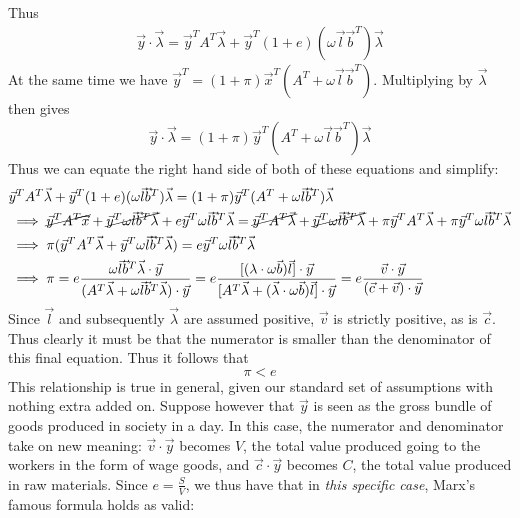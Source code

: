 Thus 
\begin{align*}
	\vec{y} \cdot \vec{\lambda} = \vec{y}^TA^T\vec{\lambda} + \vec{y}^T(1+e)(\omega\vec{l}\vec{b}^T)\vec{\lambda}
\end{align*}
At the same time we have $\vec{y}^T = (1+\pi)\vec{x}^T(A^T + \omega\vec{l}\vec{b}^T)$. Multiplying by $\vec{\lambda}$ then gives
\begin{align*}
	\vec{y}\cdot \vec{\lambda} = (1+\pi)\vec{y}^T(A^T + \omega\vec{l}\vec{b}^T)\vec{\lambda}
\end{align*}
Thus we can equate the right hand side of both of these equations and simplify:
\begin{align*}
	& \vec{y}^TA^T\vec{\lambda} + \vec{y}^T(1+e)(\omega\vec{l}\vec{b}^T)\vec{\lambda} = (1+\pi)\vec{y}^T(A^T + \omega\vec{l}\vec{b}^T)\vec{\lambda} \\
	&\implies \cancel{\vec{y}^TA^T\vec{x}} + \cancel{\vec{y}^T\omega\vec{l}\vec{b}^T\vec{\lambda}} + e\vec{y}^T\omega\vec{l}\vec{b}^T\vec{\lambda} = \cancel{\vec{y}^TA^T\vec{\lambda}} + \cancel{\vec{y}^T\omega\vec{l}\vec{b}^T\vec{\lambda}} + \pi\vec{y}^TA^T\vec{\lambda} + \pi\vec{y}^T\omega\vec{l}\vec{b}^T\vec{\lambda} \\
	&\implies \pi(\vec{y}^TA^T\vec{\lambda}+\vec{y}^T\omega\vec{l}\vec{b}^T\vec{\lambda}) = e\vec{y}^T\omega\vec{l}\vec{b}^T\vec{\lambda} \\
	&\implies \pi = e\frac{\omega\vec{l}\vec{b}^T\vec{\lambda} \cdot \vec{y}}{(A^T\vec{\lambda} + \omega\vec{l}\vec{b}^T\vec{\lambda})\cdot\vec{y}} = e\frac{[(\lambda \cdot \omega\vec{b})\vec{l}]\cdot\vec{y}}{[A^T\vec{\lambda} + (\vec{\lambda}\cdot \omega\vec{b})\vec{l}]\cdot\vec{y}} = e\frac{\vec{v} \cdot\vec{y}}{(\vec{c} + \vec{v})\cdot \vec{y}}
\end{align*}
Since $\vec{l}$ and subsequently $\vec{\lambda}$ are assumed positive, $\vec{v}$ is strictly positive, as is $\vec{c}$. Thus clearly it must be that the numerator is smaller than the denominator of this final equation. Thus it follows that
\[ \pi < e \]
This relationship is true in general, given our standard set of assumptions with nothing extra added on. Suppose however that $\vec{y}$ is seen as the gross bundle of goods produced in society in a day. In this case, the numerator and denominator take on new meaning: $\vec{v} \cdot \vec{y}$ becomes $V$, the total value produced going to the workers in the form of wage goods, and $\vec{c} \cdot \vec{y}$ becomes $C$, the total value produced in raw materials. Since $e = \frac{S}{V}$, we thus have that in \textit{this specific case}, Marx's famous formula holds as valid:
